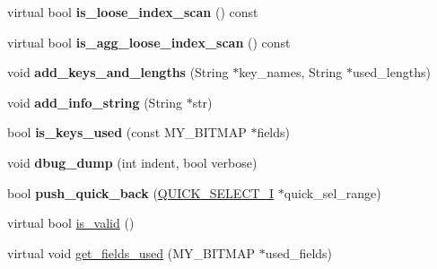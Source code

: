 \begin{DoxyCompactItemize}
virtual bool {\bfseries is\+\_\+loose\+\_\+index\+\_\+scan} () const
\item 
\mbox{\label{classQUICK__ROR__UNION__SELECT_a3075dfec690b4bd1f9abbc9a108d0939}} 
virtual bool {\bfseries is\+\_\+agg\+\_\+loose\+\_\+index\+\_\+scan} () const
\item 
\mbox{\label{classQUICK__ROR__UNION__SELECT_a9374251591754c78c45585000b72b455}} 
void {\bfseries add\+\_\+keys\+\_\+and\+\_\+lengths} (String $\ast$key\+\_\+names, String $\ast$used\+\_\+lengths)
\item 
\mbox{\label{classQUICK__ROR__UNION__SELECT_a8f6cba6f6d63fe70ca94ee9a878ce2cd}} 
void {\bfseries add\+\_\+info\+\_\+string} (String $\ast$str)
\item 
\mbox{\label{classQUICK__ROR__UNION__SELECT_a787772e07d00d3f0b850a8591e9212e7}} 
bool {\bfseries is\+\_\+keys\+\_\+used} (const M\+Y\+\_\+\+B\+I\+T\+M\+AP $\ast$fields)
\item 
\mbox{\label{classQUICK__ROR__UNION__SELECT_a93ef2ec842e9314b5267b9e0d6699299}} 
void {\bfseries dbug\+\_\+dump} (int indent, bool verbose)
\item 
\mbox{\label{classQUICK__ROR__UNION__SELECT_a44a6d7018b96f1fc61d323ab86b3876c}} 
bool {\bfseries push\+\_\+quick\+\_\+back} (\mbox{\hyperlink{classQUICK__SELECT__I}{Q\+U\+I\+C\+K\+\_\+\+S\+E\+L\+E\+C\+T\+\_\+I}} $\ast$quick\+\_\+sel\+\_\+range)
\item 
virtual bool \mbox{\hyperlink{classQUICK__ROR__UNION__SELECT_a623fe0d5f8caeb4c5cb2b934cec79394}{is\+\_\+valid}} ()
\item 
virtual void \mbox{\hyperlink{classQUICK__ROR__UNION__SELECT_a8d38063867ca6fcadbf0f6328c3d133d}{get\+\_\+fields\+\_\+used}} (M\+Y\+\_\+\+B\+I\+T\+M\+AP $\ast$used\+\_\+fields)
\end{DoxyCompactItemize}
